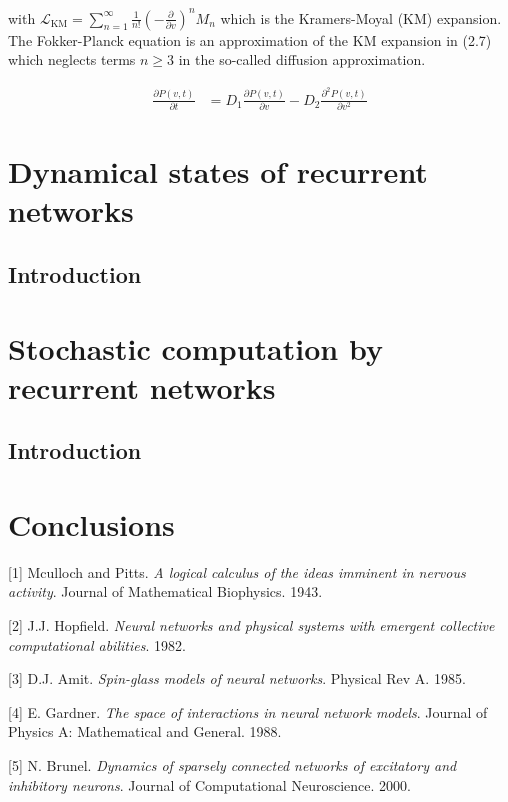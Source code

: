 \documentclass{ucetd}
\begin{document}
with $ \mathcal{L}_{\mathrm{KM}} =\sum_{n=1}^{\infty} \frac{1}{n!}\left(-\frac{\partial}{\partial v}\right)^{n} M_{n}$  which is the Kramers-Moyal (KM) expansion. The Fokker-Planck equation is an approximation of the KM expansion in (2.7) which neglects terms $n\geq 3$ in the so-called diffusion approximation.

\begin{align}
\frac{\partial P(v,t)}{\partial t} &= D_{1}\frac{\partial P(v,t)}{\partial v} - D_{2}\frac{\partial^{2} P(v,t)}{\partial v^{2}}
\end{align} 


\chapter{Dynamical states of recurrent networks}
\section{Introduction}


\chapter{Stochastic computation by recurrent networks}
\section{Introduction}

\chapter{Conclusions}


\makebibliography

[1] Mculloch and Pitts. \textit{A logical calculus of the ideas imminent in nervous activity}. Journal of Mathematical Biophysics. 1943.

[2] J.J. Hopfield. \textit{Neural networks and physical systems with emergent collective computational abilities}. 1982.

[3] D.J. Amit. \textit{Spin-glass models of neural networks}. Physical Rev A. 1985.

[4] E. Gardner. \textit{The space of interactions in neural network models}. Journal of Physics A: Mathematical and General. 1988.

[5] N. Brunel. \textit{Dynamics of sparsely connected networks of excitatory and inhibitory neurons}. Journal of Computational Neuroscience. 2000. 
\end{document}
